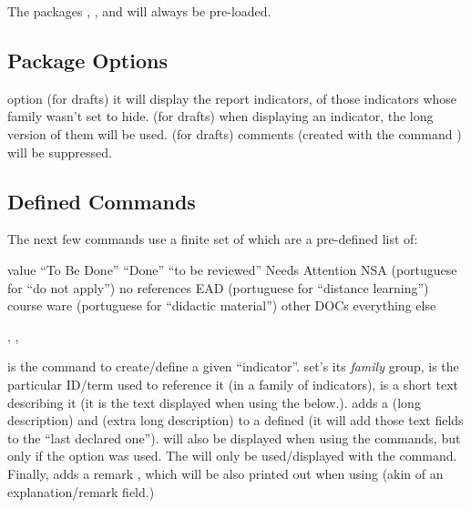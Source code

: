 \documentclass[article,nogeometry,english,tocdepth=3,secdepth=3]{ufrgscca} %
\begin{document}
The packages , ,  and  will always be pre-loaded.

\subsection{Package Options}
\begin{describelist}{option}
 { (for drafts) it will display the report indicators, of those indicators whose family wasn't set to hide.}
 { (for drafts) when displaying an indicator, the long version of them will be used.}
 { (for drafts) comments (created with the command \tsmacro{\comment}) will be suppressed.}
\end{describelist}

\subsection{Defined Commands}

The next few commands use a finite set of  which are a pre-defined list of:
\begin{describelist*}{value}
     { “To Be Done”}
     { “Done”}
     { “to be reviewed”}
     { Needs Attention}
     { NSA (portuguese for “do not apply”)}
     { no references}
     { EAD (portuguese for “distance learning”)}
     { course ware (portuguese for “didactic material”) }
     { other DOCs}
     { everything else}
\end{describelist*}

\begin{codedescribe}{\declareindicator, \indicatorDesc, \indicatorText}
	\begin{codesyntax}%
		\tsobj{\declareindicator}\tsverb{*+}
	\end{codesyntax}
\tsmacro{\declareindicator}{} is the command to create/define a given “indicator”.  set's its \emph{family} group,  is the particular ID/term used to reference it (in a family of indicators),  is a short text describing it (it is the text displayed when using the \tsmacro{\indref}{} below.). \tsmacro{\indicatorDesc}{} adds a  (long description) and  (extra long description) to a defined \tsmacro{\declareindicator}{} (it will add those text fields to the “last declared one”).  will also be displayed when using the \tsmacro{\indref}{} commands, but only if the  option was used. The  will only be used/displayed with the \tsmacro{\PrintIndicators}{} command. Finally, \tsmacro{\indicatorText}{} adds a remark , which will be also printed out when using  \tsmacro{\lstind}{} (akin of an explanation/remark field.)
\end{codedescribe}
\end{document}
